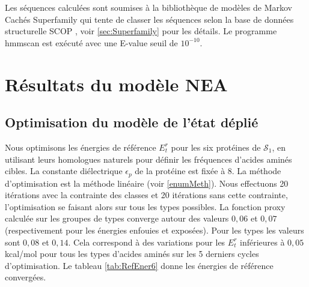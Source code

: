 Les séquences calculées sont soumises à la bibliothèque de modèles de Markov Cachés Superfamily \cite{Gough01, Wilson07}  qui tente de classer les séquences selon la base de données structurelle SCOP \cite{Andreeva04}, voir \ref{sec:Superfamily} pour les détails. Le programme hmmscan est exécuté avec une E-value seuil de $10^{-10}$. 

\section {Résultats du modèle NEA} 
\label{sectionNEA} 
\subsection{Optimisation du modèle de l'état déplié}

Nous optimisons les énergies de référence $E_t^r$ pour les six protéines de $\mathcal{S}_1$, en utilisant leurs homologues naturels pour définir les fréquences d'acides aminés cibles. La constante diélectrique $\epsilon_p$ de la protéine est fixée à $8$. La méthode d'optimisation est la méthode linéaire (voir \ref{enumMeth}). Nous effectuons 20 itérations avec la contrainte des classes et 20 itérations sans cette contrainte, l'optimisation se faisant alors sur tous les types possibles. La fonction proxy calculée sur les groupes de types converge autour des valeurs $0,06$ et $0,07$ (respectivement pour les énergies enfouies et exposées). Pour les types les valeurs sont $0,08$ et $0,14$. Cela correspond à des variations  pour les $E_t^r$ inférieures à $0,05$ kcal/mol pour tous les types d'acides aminés sur les 5 derniers cycles d'optimisation. Le tableau \ref{tab:RefEner6} donne les énergies de référence convergées.

